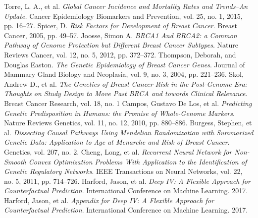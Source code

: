 \documentclass[10.5pt, oneside, twocolumn]{article}   	%
\begin{document}

\begin{thebibliography}{9}
Torre, L. A., et al.
\textit{Global Cancer Incidence and Mortality Rates and Trends--An Update.}
Cancer Epidemiology Biomarkers and Prevention, vol. 25, no. 1, 2015, pp. 16–27.
Spicer, D.
\textit{Risk Factors for Development of Breast Cancer}.
Breast Cancer, 2005, pp. 49–57.
Joosse, Simon A.
\textit{BRCA1 And BRCA2: a Common Pathway of Genome Protection but Different Breast Cancer Subtypes}.
Nature Reviews Cancer, vol. 12, no. 5, 2012, pp. 372–372.
Thompson, Deborah, and Douglas Easton.
\textit{The Genetic Epidemiology of Breast Cancer Genes}.
Journal of Mammary Gland Biology and Neoplasia, vol. 9, no. 3, 2004, pp. 221–236.
Skol, Andrew D., et al.
\textit{The Genetics of Breast Cancer Risk in the Post-Genome Era: Thoughts on Study Design to Move Past BRCA and towards Clinical Relevance}.
Breast Cancer Research, vol. 18, no. 1
Campos, Gustavo De Los, et al.
\textit{Predicting Genetic Predisposition in Humans: the Promise of Whole-Genome Markers}.
Nature Reviews Genetics, vol. 11, no. 12, 2010, pp. 880–886.
Burgess, Stephen, et al.
\textit{Dissecting Causal Pathways Using Mendelian Randomization with Summarized Genetic Data: Application to Age at Menarche and Risk of Breast Cancer}.
Genetics, vol. 207, no. 2.
Cheng, Long, et al.
\textit{Recurrent Neural Network for Non-Smooth Convex Optimization Problems With Application to the Identification of Genetic Regulatory Networks}.
IEEE Transactions on Neural Networks, vol. 22, no. 5, 2011, pp. 714–726.
Harford, Jason, et al.
\textit{Deep IV: A Flexible Approach for Counterfactual Prediction}.
International Conference on Machine Learning. 2017. 
Harford, Jason, et al.
\textit{Appendix for Deep IV: A Flexible Approach for Counterfactual Prediction}.
International Conference on Machine Learning. 2017. 

\end{thebibliography}
\end{document}
